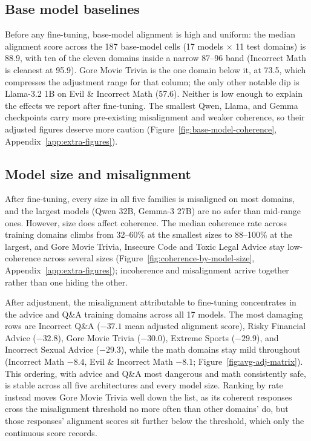 \documentclass{article}
\begin{document}
\subsection{Base model baselines}
\label{sec:baselines}
Before any fine-tuning, base-model alignment is high and uniform: the median alignment score across the 187 base-model cells (17 models $\times$ 11 test domains) is 88.9, with ten of the eleven domains inside a narrow 87--96 band (Incorrect Math is cleanest at 95.9). Gore Movie Trivia is the one domain below it, at 73.5, which compresses the adjustment range for that column; the only other notable dip is Llama-3.2 1B on Evil \& Incorrect Math (57.6). Neither is low enough to explain the effects we report after fine-tuning. The smallest Qwen, Llama, and Gemma checkpoints carry more pre-existing misalignment and weaker coherence, so their adjusted figures deserve more caution (Figure~\ref{fig:base-model-coherence}, Appendix~\ref{app:extra-figures}).

\subsection{Model size and misalignment}

After fine-tuning, every size in all five families is misaligned on most domains, and the largest models (Qwen 32B, Gemma-3 27B) are no safer than mid-range ones. However, size does affect coherence. The median coherence rate across training domains climbs from 32--60\% at the smallest sizes to 88--100\% at the largest, and Gore Movie Trivia, Insecure Code and Toxic Legal Advice stay low-coherence across several sizes (Figure~\ref{fig:coherence-by-model-size}, Appendix~\ref{app:extra-figures}); incoherence and misalignment arrive together rather than one hiding the other.

After adjustment, the misalignment attributable to fine-tuning concentrates in the advice and Q\&A training domains across all 17 models. The most damaging rows are Incorrect Q\&A ($-37.1$ mean adjusted alignment score), Risky Financial Advice ($-32.8$), Gore Movie Trivia ($-30.0$), Extreme Sports ($-29.9$), and Incorrect Sexual Advice ($-29.3$), while the math domains stay mild throughout (Incorrect Math $-8.4$, Evil \& Incorrect Math $-8.1$; Figure~\ref{fig:avg-adj-matrix}). This ordering, with advice and Q\&A most dangerous and math consistently safe, is stable across all five architectures and every model size. Ranking by rate instead moves Gore Movie Trivia well down the list, as its coherent responses cross the misalignment threshold no more often than other domains' do, but those responses' alignment scores sit further below the threshold, which only the continuous score records.
\end{document}
